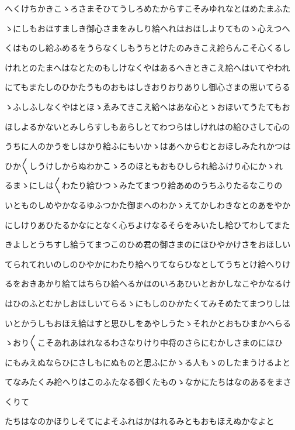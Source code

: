 \documentclass[a4paper,11pt,landscape]{ltjtarticle}
\begin{document}
\par\medskip
へくけちかきこゝろさまそひてうしろめたからすこそみゆれなとほめたまふた
\par\medskip
ゝにしもおほすましき御心さまをみしり給へれはおほしよりてものゝ心えつへ
\par\medskip
くはものし給ふめるをうらなくしもうちとけたのみきこえ給らんこそ心くるし
\par\medskip
けれとのたまへはなとたのもしけなくやはあるへきときこえ給へはいてやわれ
\par\medskip
にてもまたしのひかたうものおもはしきおりおりありし御心さまの思いてらる
\par\medskip
ゝふしふしなくやはとほゝゑみてきこえ給へはあな心とゝおほいてうたてもお
\par\medskip
ほしよるかないとみしらすしもあらしとてわつらはしけれはの給ひさして心の
\par\medskip
うちに人のかうをしはかり給ふにもいかゝはあへからむとおほしみたれかつは
\par\medskip
ひか〱しうけしからぬわかこゝろのほともおもひしられ給ふけり心にかゝれ
\par\medskip
るまゝにしは〱わたり給ひつゝみたてまつり給あめのうちふりたるなこりの
\par\medskip
いとものしめやかなるゆふつかた御まへのわかゝえてかしわきなとのあをやか
\par\medskip
にしけりあひたるかなにとなく心ちよけなるそらをみいたし給ひてわしてまた
\par\medskip
きよしとうちすし給うてまつこのひめ君の御さまのにほひやかけさをおほしい
\par\medskip
てられてれいのしのひやかにわたり給へりてならひなとしてうちとけ給へりけ
\par\medskip
るをおきあかり給てはちらひ給へるかほのいろあひいとおかしなこやかなるけ
\par\medskip
はひのふとむかしおほしいてらるゝにもしのひかたくてみそめたてまつりしは
\par\medskip
いとかうしもおほえ給はすと思ひしをあやしうたゝそれかとおもひまかへらる
\par\medskip
ゝおり〱こそあれあはれなるわさなりけり中将のさらにむかしさまのにほひ
\par\medskip
にもみえぬならひにさしもにぬものと思ふにかゝる人もゝのしたまうけるよと
\par\medskip
てなみたくみ給へりはこのふたなる御くたものゝなかにたちはなのあるをまさ
\par\medskip
くりて
\par\medskip
たちはなのかほりしそてによそふれはかはれるみともおもほえぬかなよと
\end{document}
